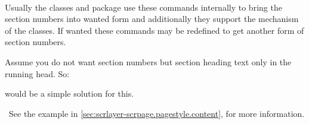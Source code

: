 \begin{Declaration}
  \\
  \\
  \\
  \\
  \\
  \\
\end{Declaration}
%
%
%
%
%
%
%
Usually the \KOMAScript{} classes and package  use these
commands internally to bring the section numbers into wanted form and
additionally they support the  mechanism of the \KOMAScript{}
classes. If wanted these commands may be redefined to get another form of
section numbers.%
\ifCommonscrlayerscrpage%
\begin{Example}
  Assume you do not want section numbers but section heading text only in the
  running head. So:
\begin{lstcode}
  \renewcommand*{\sectionmarkformat}{}
\end{lstcode}
  would be a simple solution for this.
\end{Example}
\else %
  \ See the example in
  \autoref{sec:scrlayer-scrpage.pagestyle.content},
   for more
  information.%
\fi %
%
%
%
%
%
%
%
%

